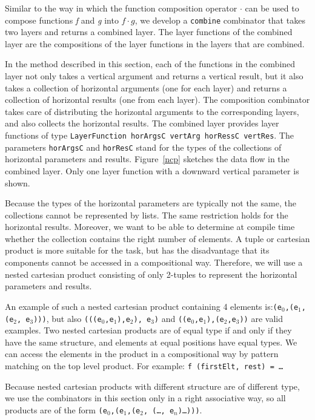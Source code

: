 Similar to the way in which the function composition operator $\cdot$ can be used to compose functions {\em f} and {\em g} into $f \cdot g$, we develop a \texttt{combine} combinator that takes two layers and returns a combined layer. The layer functions of the combined layer are the compositions of the layer functions in the layers that are combined.

In the method described in this section, each of the functions in the combined layer not only takes a vertical argument and returns a vertical result, but it also takes a collection of horizontal arguments (one for each layer) and returns a collection of horizontal results (one from each layer). The composition combinator takes care of distributing the horizontal arguments to the corresponding layers, and also collects the horizontal results. The combined layer provides layer functions of type \texttt{LayerFunction horArgsC vertArg horRessC vertRes}. The parameters \texttt{horArgsC} and \texttt{horResC} stand for the types of the collections of horizontal parameters and results. Figure~\ref{ncp} sketches the data flow in the combined layer. Only one layer function with a downward vertical parameter is shown.

Because the types of the horizontal parameters are typically not the same, the collections cannot be represented by lists. The same restriction holds for the horizontal results. Moreover, we want to be able to determine at compile time whether the collection contains the right number of elements. A tuple or cartesian product is more suitable for the task, but has the disadvantage that its components cannot be accessed in a compositional way. Therefore, we will use a nested cartesian product consisting of only 2-tuples to represent the horizontal parameters and results.

An example of such a nested cartesian product containing 4 elements is:\texttt{(e$_0$,(e$_1$,(e$_2$, e$_3$)))}, but also \texttt{(((e$_0$,e$_1$),e$_2$), e$_3$)} and \texttt{((e$_0$,e$_1$),(e$_2$,e$_3$))} are valid examples. Two nested cartesian products are of equal type if and only if they have the same structure, and elements at equal positions have equal types. We can access the elements in the product in a compositional way by pattern matching on the top level product. For example: \texttt{f (firstElt, rest) = \dots}

Because nested cartesian products with different structure are of different type, we use the combinators in this section only in a right associative way, so all products are of the form \texttt{(e$_0$,(e$_1$,(e$_2$, (\dots, e$_n$)\dots)))}. 

